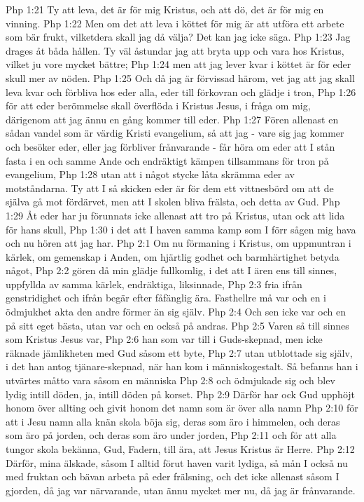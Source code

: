 Php 1:21  Ty att leva, det är för mig Kristus, och att dö, det är för mig en vinning.
Php 1:22  Men om det att leva i köttet för mig är att utföra ett arbete som bär frukt, vilketdera skall jag då välja? Det kan jag icke säga.
Php 1:23  Jag drages åt båda hållen. Ty väl åstundar jag att bryta upp och vara hos Kristus, vilket ju vore mycket bättre;
Php 1:24  men att jag lever kvar i köttet är för eder skull mer av nöden.
Php 1:25  Och då jag är förvissad härom, vet jag att jag skall leva kvar och förbliva hos eder alla, eder till förkovran och glädje i tron,
Php 1:26  för att eder berömmelse skall överflöda i Kristus Jesus, i fråga om mig, därigenom att jag ännu en gång kommer till eder.
Php 1:27  Fören allenast en sådan vandel som är värdig Kristi evangelium, så att jag - vare sig jag kommer och besöker eder, eller jag förbliver frånvarande - får höra om eder att I stån fasta i en och samme Ande och endräktigt kämpen tillsammans för tron på evangelium,
Php 1:28  utan att i något stycke låta skrämma eder av motståndarna. Ty att I så skicken eder är för dem ett vittnesbörd om att de själva gå mot fördärvet, men att I skolen bliva frälsta, och detta av Gud.
Php 1:29  Åt eder har ju förunnats icke allenast att tro på Kristus, utan ock att lida för hans skull,
Php 1:30  i det att I haven samma kamp som I förr sågen mig hava och nu hören att jag har.
Php 2:1  Om nu förmaning i Kristus, om uppmuntran i kärlek, om gemenskap i Anden, om hjärtlig godhet och barmhärtighet betyda något,
Php 2:2  gören då min glädje fullkomlig, i det att I ären ens till sinnes, uppfyllda av samma kärlek, endräktiga, liksinnade,
Php 2:3  fria ifrån genstridighet och ifrån begär efter fåfänglig ära. Fasthellre må var och en i ödmjukhet akta den andre förmer än sig själv.
Php 2:4  Och sen icke var och en på sitt eget bästa, utan var och en också på andras.
Php 2:5  Varen så till sinnes som Kristus Jesus var,
Php 2:6  han som var till i Guds-skepnad, men icke räknade jämlikheten med Gud såsom ett byte,
Php 2:7  utan utblottade sig själv, i det han antog tjänare-skepnad, när han kom i människogestalt. Så befanns han i utvärtes måtto vara såsom en människa
Php 2:8  och ödmjukade sig och blev lydig intill döden, ja, intill döden på korset.
Php 2:9  Därför har ock Gud upphöjt honom över allting och givit honom det namn som är över alla namn
Php 2:10  för att i Jesu namn alla knän skola böja sig, deras som äro i himmelen, och deras som äro på jorden, och deras som äro under jorden,
Php 2:11  och för att alla tungor skola bekänna, Gud, Fadern, till ära, att Jesus Kristus är Herre.
Php 2:12  Därför, mina älskade, såsom I alltid förut haven varit lydiga, så mån I också nu med fruktan och bävan arbeta på eder frälsning, och det icke allenast såsom I gjorden, då jag var närvarande, utan ännu mycket mer nu, då jag är frånvarande.
